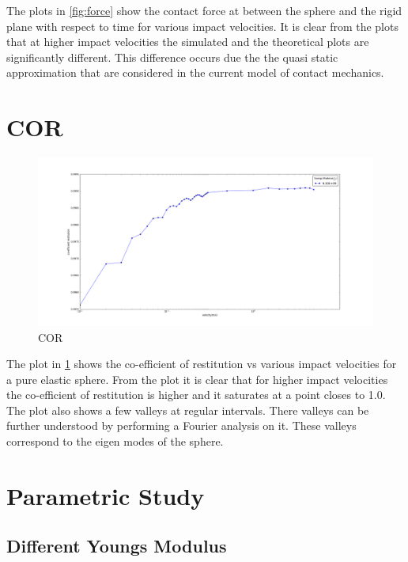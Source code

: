 The plots in \ref{fig:force} show the contact force at between the sphere and the rigid plane with respect to time for various impact velocities. It is clear from the plots that at higher impact velocities the simulated and the theoretical plots are significantly different. This difference occurs due the the quasi static approximation that are considered in the current model of contact mechanics.

\section{COR}

\begin{figure}[H]
\includegraphics[width=1.25\textwidth]{../images/COR/COR.png}
\caption{COR}
\label{fig:COR}
\end{figure}

The plot in \ref{fig:COR} shows the co-efficient of restitution vs various impact velocities for a pure elastic sphere. From the plot it is clear that for higher impact velocities the co-efficient of restitution is higher and it saturates at a point closes to 1.0. The plot also shows a few valleys at regular intervals. There valleys can be further understood by performing a Fourier analysis on it. These valleys correspond to the eigen modes of the sphere. 



\section{Parametric Study}

\subsection{Different Youngs Modulus}

